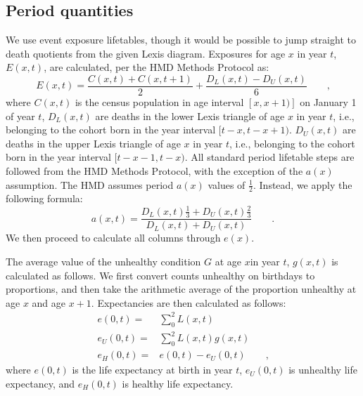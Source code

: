 \documentclass[11pt,oneside,a4paper]{article} %
\newcommand{\tc}{\quad\quad\text{,}}
\newcommand{\tp}{\quad\quad\text{.}}
\begin{document}
\subsection{Period quantities}
We use event exposure lifetables, though it would be possible to jump straight
to death quotients from the given Lexis diagram.
Exposures for age $x$ in year $t$, $E(x,t)$, are calculated, per the HMD Methods
Protocol \citep{Wilmoth2007} as:
\begin{equation}
E(x,t) = \frac{C(x,t) + C(x,t+1)}{2} + \frac{D_L(x,t) - D_U(x,t)}{6} \tc
\end{equation}
where $C(x,t)$ is the census population in age interval $[x,x+1)]$ on January 1
of year $t$, $D_L(x,t)$ are deaths in the lower Lexis triangle of age $x$ in
year $t$, i.e., belonging to the cohort born in the year interval $[t-x,t-x+1)$.
$D_U(x,t)$ are deaths in the upper Lexis triangle of age $x$ in
year $t$, i.e., belonging to the cohort born in the year interval
$[t-x-1,t-x)$. All standard period lifetable steps are followed from the HMD
Methods Protocol, with the exception of the $a(x)$ assumption. The HMD assumes period $a(x)$
values of $\frac{1}{2}$. Instead, we apply the following formula:
\begin{equation}
a(x,t) = \frac{D_L(x,t)\frac{1}{3} + D_U(x,t)\frac{2}{3}}{D_L(x,t) + D_U(x,t)}
\tp
\end{equation}
We then proceed to calculate all columns through $e(x)$. 

The average value of the unhealthy condition $G$ at age $x$in year $t$, $g(x,t)$
is calculated as follows. We first convert counts unhealthy on birthdays to
proportions, and then take the arithmetic average of the proportion unhealthy at
age $x$ and age $x+1$. Expectancies are then calculated as follows:
\begin{align}
e(0,t) =&\sum _0^2 L(x,t) \\
e_U(0,t) =&\sum _0^2 L(x,t) g(x,t) \\
e_H(0,t) =& e(0,t) - e_U(0,t) \tc
\end{align}
where $e(0,t)$ is the life expectancy at birth in year $t$, $e_U(0,t)$ is
unhealthy life expectancy, and $e_H(0,t)$ is healthy life expectancy.
\end{document}
